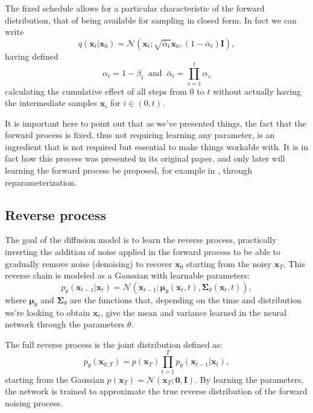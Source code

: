 \documentclass[a4paper, 12pt]{article}          %
\begin{document}
The fixed schedule allows for a particular characteristic of the forward distribution, that of being available for sampling in closed form. In fact we can write
\begin{equation}
    q(\mathbf{x}_t | \mathbf{x}_0) = \mathcal{N}(\mathbf{x}_t;\sqrt{\bar{\alpha}_t}\mathbf{x}_0 , (1-\bar{\alpha}_t)\mathbf{I}),
\end{equation}
having defined
\begin{equation} \label{eq:alphas}
    \alpha_t = 1 - \beta_t \;\; \mathrm{and}\;\;\bar{\alpha}_t = \prod_{s=1}^t \alpha_s
\end{equation}
calculating the cumulative effect of all steps from $0$ to $t$ without actually having the intermediate samples $\mathbf{x}_i$ for $i\in(0,t)$.

It is important here to point out that as we've presented things, the fact that the forward process is fixed, thus not requiring learning any parameter, is an ingredient that is not required but essential to make things workable with. It is in fact how this process was presented in its original paper, and only later will learning the forward process be proposed, for example in \cite{Nichol2021ImprovedDDPM}, through reparameterization.

\subsection{Reverse process}

The goal of the diffusion model is to learn the reverse process, practically inverting the addition of noise applied in the forward process to be able to gradually remove noise (denoising) to recover $\mathbf{x}_0$ starting from the noisy $\mathbf{x}_T$. This reverse chain is modeled as a Gaussian with learnable parameters: 
\begin{equation} \label{eq:rev_def}
p_\theta(\mathbf{x}_{t-1} | \mathbf{x}_t) = \mathcal{N}(\mathbf{x}_{t-1}; \boldsymbol{\mu}_\theta(\mathbf{x}_t, t), \boldsymbol{\Sigma}_\theta(\mathbf{x}_t, t)),
\end{equation}
where $\boldsymbol{\mu}_\theta$ and $\boldsymbol{\Sigma}_\theta$ are the functions that, depending on the time and distribution we're looking to obtain $\mathbf{x}_t$, give the mean and variance learned in the neural network through the parameters $\theta$. 

The full reverse process is the joint distribution defined as:
\begin{equation}
    p_\theta(\mathbf{x}_{0:T}) = p(\mathbf{x}_T) \prod^T_{t=1}p_\theta ( \mathbf{x}_{t-1}|\mathbf{x}_t),
\end{equation}
starting from the Gaussian $p(\mathbf{x}_T) = \mathcal{N}(\mathbf{x}_T;\boldsymbol{0},\mathbf{I})$. By learning the parameters, the network is trained to approximate the true reverse distribution of the forward noising process.
\end{document}
